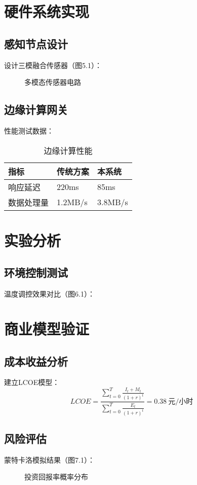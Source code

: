 \documentclass[12pt,a4paper]{IEEEtran} %
\begin{document}
\section{硬件系统实现}
\subsection{感知节点设计}
设计三模融合传感器（图5.1）：
\begin{figure}[htbp]
  \centering
  \caption{多模态传感器电路}
\end{figure}

\subsection{边缘计算网关}
性能测试数据：
\begin{table}[htbp]
  \caption{边缘计算性能}
  \begin{tabularx}{\linewidth}{lXX}
    \toprule
    指标    & 传统方案    & 本系统     \\
    \midrule
    响应延迟  & 220ms   & 85ms    \\
    数据处理量 & 1.2MB/s & 3.8MB/s \\
    \bottomrule
  \end{tabularx}
\end{table}

\section{实验分析}
\subsection{环境控制测试}
温度调控效果对比（图6.1）：


\section{商业模型验证}
\subsection{成本收益分析}
建立LCOE模型：
\begin{equation}
  LCOE = \frac{\sum_{t=0}^T \frac{I_t + M_t}{(1+r)^t}}{\sum_{t=0}^T \frac{E_t}{(1+r)^t}} = 0.38\ \text{元/小时}
\end{equation}

\subsection{风险评估}
蒙特卡洛模拟结果（图7.1）：
\begin{figure}[htbp]
  \centering
  \caption{投资回报率概率分布}
\end{figure}
\end{document}
